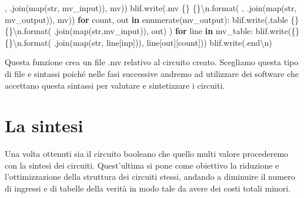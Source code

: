 \documentclass[
  italian,
]{book}
\newenvironment{Shaded}{\begin{snugshade}}{\end{snugshade}}
\newcommand{\BuiltInTok}[1]{#1}
\newcommand{\CharTok}[1]{\textcolor[rgb]{0.31,0.60,0.02}{#1}}
\newcommand{\ControlFlowTok}[1]{\textcolor[rgb]{0.13,0.29,0.53}{\textbf{#1}}}
\newcommand{\KeywordTok}[1]{\textcolor[rgb]{0.13,0.29,0.53}{\textbf{#1}}}
\newcommand{\NormalTok}[1]{#1}
\newcommand{\SpecialCharTok}[1]{\textcolor[rgb]{0.00,0.00,0.00}{#1}}
\newcommand{\StringTok}[1]{\textcolor[rgb]{0.31,0.60,0.02}{#1}}
\begin{document}
\begin{Shaded}
\begin{Highlighting}[]
      \StringTok{\textquotesingle{}, \textquotesingle{}}\NormalTok{.join(}\BuiltInTok{map}\NormalTok{(}\BuiltInTok{str}\NormalTok{, mv\_input)), mv))}
\NormalTok{  blif.write(}\StringTok{\textquotesingle{}.mv }\SpecialCharTok{\{\}}\StringTok{ }\SpecialCharTok{\{\}}\CharTok{\textbackslash{}n}\StringTok{\textquotesingle{}}\NormalTok{.}\BuiltInTok{format}\NormalTok{(}
      \StringTok{\textquotesingle{}, \textquotesingle{}}\NormalTok{.join(}\BuiltInTok{map}\NormalTok{(}\BuiltInTok{str}\NormalTok{, mv\_output)), mv))}
  \ControlFlowTok{for}\NormalTok{ count, out }\KeywordTok{in} \BuiltInTok{enumerate}\NormalTok{(mv\_output):}
\NormalTok{      blif.write(}\StringTok{\textquotesingle{}.table }\SpecialCharTok{\{\}}\StringTok{ }\SpecialCharTok{\{\}}\CharTok{\textbackslash{}n}\StringTok{\textquotesingle{}}\NormalTok{.}\BuiltInTok{format}\NormalTok{(}
        \StringTok{\textquotesingle{} \textquotesingle{}}\NormalTok{.join(}\BuiltInTok{map}\NormalTok{(}\BuiltInTok{str}\NormalTok{,mv\_input)), out)}
\NormalTok{      )}
    \ControlFlowTok{for}\NormalTok{ line }\KeywordTok{in}\NormalTok{ mv\_table:}
\NormalTok{      blif.write(}\StringTok{\textquotesingle{}}\SpecialCharTok{\{\}}\StringTok{ }\SpecialCharTok{\{\}}\CharTok{\textbackslash{}n}\StringTok{\textquotesingle{}}\NormalTok{.}\BuiltInTok{format}\NormalTok{(}
        \StringTok{\textquotesingle{} \textquotesingle{}}\NormalTok{.join(}\BuiltInTok{map}\NormalTok{(}\BuiltInTok{str}\NormalTok{, line[}\StringTok{\textquotesingle{}inp\textquotesingle{}}\NormalTok{])), line[}\StringTok{\textquotesingle{}out\textquotesingle{}}\NormalTok{][count]))}
\NormalTok{  blif.write(}\StringTok{\textquotesingle{}.end}\CharTok{\textbackslash{}n}\StringTok{\textquotesingle{}}\NormalTok{)}
\end{Highlighting}
\end{Shaded}

Questa funzione crea un file .mv relativo al circuito creato. Scegliamo questa tipo di file e sintassi poiché nelle fasi successive andremo ad utilizzare dei software che accettano questa sintassi per valutare e sintetizzare i circuiti.

\newpage

\hypertarget{la-sintesi}{%
\section{La sintesi}\label{la-sintesi}}

Una volta ottenuti sia il circuito booleano che quello multi valore procederemo con la sintesi dei circuiti. Quest'ultima si pone come obiettivo la riduzione e l'ottimizzazione della struttura dei circuiti stessi, andando a diminuire il numero di ingressi e di tabelle della verità in modo tale da avere dei costi totali minori.
\end{document}
